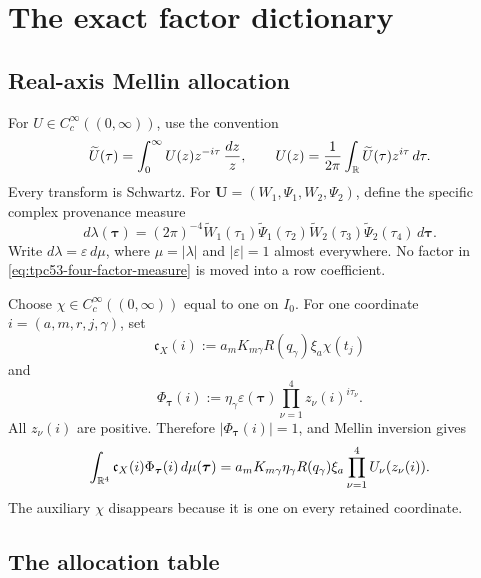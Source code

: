 \section{The exact factor dictionary}
\label{sec:tpc53-dictionary}

\subsection{Real-axis Mellin allocation}

For \(U\in C_c^\infty((0,\infty))\), use the convention
\begin{equation}
 \widetilde U(\tau)
 =\int_0^\infty U(z)z^{-i\tau}\,\frac{dz}{z},
 \qquad
 U(z)=\frac1{2\pi}\int_{\mathbb R}\widetilde U(\tau)z^{i\tau}\,d\tau.
 \label{eq:tpc53-Mellin-convention}
\end{equation}
Every transform is Schwartz.  For
\(\mathbf U=(W_1,\Psi_1,W_2,\Psi_2)\), define the specific complex
provenance measure
\begin{equation}
 d\lambda(\bm\tau)
 =(2\pi)^{-4}
 \widetilde W_1(\tau_1)\widetilde\Psi_1(\tau_2)
 \widetilde W_2(\tau_3)\widetilde\Psi_2(\tau_4)
 \,d\bm\tau.
 \label{eq:tpc53-four-factor-measure}
\end{equation}
Write \(d\lambda=\varepsilon\,d\mu\), where
\(\mu=|\lambda|\) and \(|\varepsilon|=1\) almost everywhere.  No
factor in \eqref{eq:tpc53-four-factor-measure} is moved into a row
coefficient.

Choose \(\chi\in C_c^\infty((0,\infty))\) equal to one on \(I_0\).
For one coordinate \(i=(a,m,r,j,\gamma)\), set
\begin{equation}
 \mathfrak c_X(i):=
 a_mK_{m\gamma}R(q_\gamma)\xi_a\chi(t_j)
 \label{eq:tpc53-carrier-coordinate}
\end{equation}
and
\begin{equation}
 \Phi_{\bm\tau}(i)
 :=\eta_\gamma\varepsilon(\bm\tau)
   \prod_{\nu=1}^4 z_\nu(i)^{i\tau_\nu}.
 \label{eq:tpc53-unimodular-phase}
\end{equation}
All \(z_\nu(i)\) are positive.  Therefore
\(|\Phi_{\bm\tau}(i)|=1\), and Mellin inversion gives
\begin{equation}
 \int_{\mathbb R^4}\mathfrak c_X(i)\Phi_{\bm\tau}(i)\,d\mu(\bm\tau)
 =a_mK_{m\gamma}\eta_\gamma R(q_\gamma)\xi_a
   \prod_{\nu=1}^4U_\nu(z_\nu(i)).
 \label{eq:tpc53-coordinate-reassembly}
\end{equation}
The auxiliary \(\chi\) disappears because it is one on every retained
coordinate.

\subsection{The allocation table}

